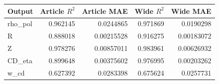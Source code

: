 \begin{tabular}{lrrrr}
\toprule
Output & Article $R^2$ & Article MAE & Wide $R^2$ & Wide MAE \\
\midrule
rho\_pol & 0.962145 & 0.0244865 & 0.971869 & 0.0190298 \\
R & 0.888018 & 0.00215528 & 0.916275 & 0.00183072 \\
Z & 0.978276 & 0.00857011 & 0.983961 & 0.00626932 \\
CD\_eta & 0.899648 & 0.00375602 & 0.976995 & 0.00203262 \\
w\_cd & 0.627392 & 0.0283398 & 0.675624 & 0.0257731 \\
\bottomrule
\end{tabular}
